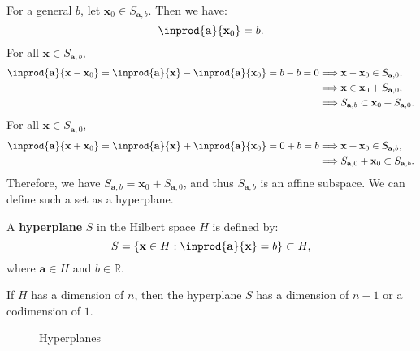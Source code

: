 \documentclass{huhtakm-template-book-v2}
\begin{document}
    For a general $b$, let $\mathbf{x}_{0}\in S_{\mathbf{a},b}$. Then we have:
    \begin{equation*}
        \inprod{\mathbf{a}}{\mathbf{x}_{0}}=b.
    \end{equation*}
    For all $\mathbf{x} \in S_{\mathbf{a},b}$,
    \begin{align*}
        \inprod{\mathbf{a}}{\mathbf{x} - \mathbf{x}_{0}} = \inprod{\mathbf{a}}{\mathbf{x}} - \inprod{\mathbf{a}}{\mathbf{x}_{0}} = b-b = 0 &\Longrightarrow \mathbf{x}-\mathbf{x}_{0}\in S_{\mathbf{a},0},\\
        &\Longrightarrow \mathbf{x} \in \mathbf{x}_{0} + S_{\mathbf{a},0},\\
        &\Longrightarrow S_{\mathbf{a},b} \subset \mathbf{x}_{0} + S_{\mathbf{a},0}.
    \end{align*}
    For all $\mathbf{x} \in S_{\mathbf{a},0}$,
    \begin{align*}
        \inprod{\mathbf{a}}{\mathbf{x} + \mathbf{x}_{0}} = \inprod{\mathbf{a}}{\mathbf{x}} + \inprod{\mathbf{a}}{\mathbf{x}_{0}} = 0 + b = b &\Longrightarrow \mathbf{x} + \mathbf{x}_{0} \in S_{\mathbf{a},b},\\
        &\Longrightarrow S_{\mathbf{a},0} + \mathbf{x}_{0} \subset S_{\mathbf{a},b}.
    \end{align*}
    Therefore, we have $S_{\mathbf{a},b} = \mathbf{x}_{0} + S_{\mathbf{a},0}$, and thus $S_{\mathbf{a},b}$ is an affine subspace. We can define such a set as a hyperplane.
    \begin{defn}
        A \textbf{hyperplane} $S$ in the Hilbert space $H$ is defined by:
        \begin{equation*}
            S = \{\mathbf{x} \in H:\inprod{\mathbf{a}}{\mathbf{x}} = b\} \subset H,
        \end{equation*}
        where $\mathbf{a} \in H$ and $b \in \mathbb{R}$. 
    \end{defn}
    \begin{rem}
        If $H$ has a dimension of $n$, then the hyperplane $S$ has a dimension of $n-1$ or a codimension of $1$.
    \end{rem}
    \begin{figure}[h!]
        \centering
        \caption{Hyperplanes}
    \end{figure}
    \newpage
\end{document}
